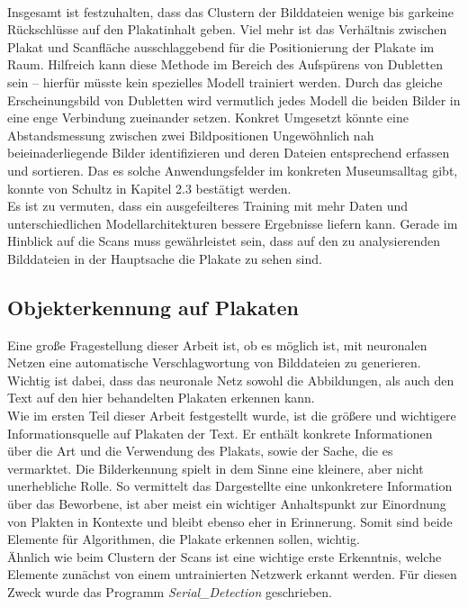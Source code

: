 \documentclass[a4paper,12pt,ngerman]{article}
\begin{document}
\\
Insgesamt ist festzuhalten, dass das Clustern der Bilddateien wenige bis garkeine Rückschlüsse auf den Plakatinhalt geben. Viel mehr ist das Verhältnis zwischen Plakat und Scanfläche ausschlaggebend für die Positionierung der Plakate im Raum. Hilfreich kann diese Methode im Bereich des Aufspürens von Dubletten sein -- hierfür müsste kein spezielles Modell trainiert werden. Durch das gleiche Erscheinungsbild von Dubletten wird vermutlich jedes Modell die beiden Bilder in eine enge Verbindung zueinander setzen. Konkret Umgesetzt könnte eine Abstandsmessung zwischen zwei Bildpositionen Ungewöhnlich nah beieinaderliegende Bilder identifizieren und deren Dateien entsprechend erfassen und sortieren. Das es solche Anwendungsfelder im konkreten Museumsalltag gibt, konnte von Schultz in Kapitel 2.3 bestätigt werden. \\
Es ist zu vermuten, dass ein ausgefeilteres Training mit mehr Daten und unterschiedlichen Modellarchitekturen bessere Ergebnisse liefern kann. Gerade im Hinblick auf die Scans muss gewährleistet sein, dass auf den zu analysierenden Bilddateien in der Hauptsache die Plakate zu sehen sind. \\

\subsection{Objekterkennung auf Plakaten}

Eine große Fragestellung dieser Arbeit ist, ob es möglich ist, mit neuronalen Netzen eine automatische Verschlagwortung von Bilddateien zu generieren. Wichtig ist dabei, dass das neuronale Netz sowohl die Abbildungen, als auch den Text auf den hier behandelten Plakaten erkennen kann. \\
Wie im ersten Teil dieser Arbeit festgestellt wurde, ist die größere und wichtigere Informationsquelle auf Plakaten der Text. Er enthält konkrete Informationen über die Art und die Verwendung des Plakats, sowie der Sache, die es vermarktet. Die Bilderkennung spielt in dem Sinne eine kleinere, aber nicht unerhebliche Rolle. So vermittelt das Dargestellte eine unkonkretere Information über das Beworbene, ist aber meist ein wichtiger Anhaltspunkt zur Einordnung von Plakten in Kontexte und bleibt ebenso eher in Erinnerung. Somit sind beide Elemente für Algorithmen, die Plakate erkennen sollen, wichtig. \\

Ähnlich wie beim Clustern der Scans ist eine wichtige erste Erkenntnis, welche Elemente zunächst von einem untrainierten Netzwerk erkannt werden. Für diesen Zweck wurde das Programm \textit{Serial\_Detection} geschrieben. \\
\end{document}
